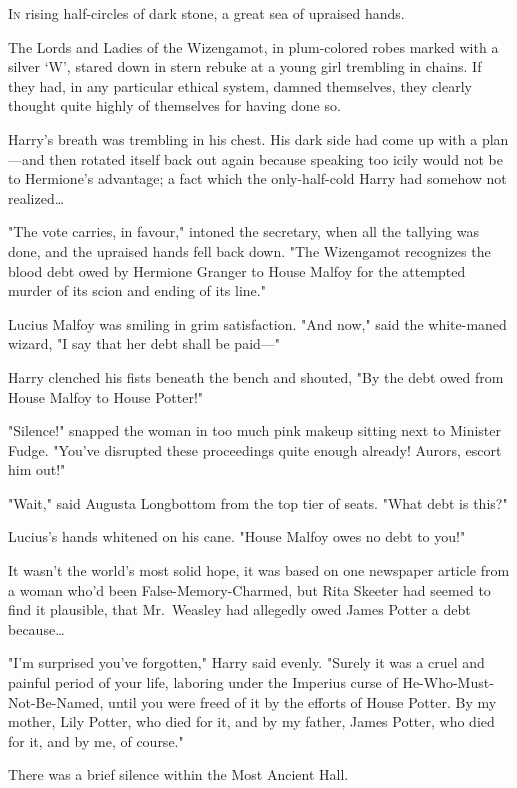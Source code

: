 
\lettrine{I}{n} rising
half-circles of dark stone, a great sea of upraised hands.

\quad\quad
The Lords and Ladies of the Wizengamot, in plum-colored robes marked with a
silver `W', stared down in stern rebuke at a young girl trembling in chains. If
they had, in any particular ethical system, damned themselves, they clearly
thought quite highly of themselves for having done so.

Harry's breath was trembling in his chest. His dark side had come up with a
plan---and then rotated itself back out again because speaking too icily would
not be to Hermione's advantage; a fact which the only-half-cold Harry had
somehow not realized{\ldots}

"The vote carries, in favour," intoned the secretary, when all the tallying was
done, and the upraised hands fell back down. "The Wizengamot recognizes the
blood debt owed by Hermione Granger to House Malfoy for the attempted murder of
its scion and ending of its line."

Lucius Malfoy was smiling in grim satisfaction. "And now," said the white-maned
wizard, "I say that her debt shall be paid---"

Harry clenched his fists beneath the bench and shouted, "By the debt owed from
House Malfoy to House Potter!"

"Silence!" snapped the woman in too much pink makeup sitting next to Minister
Fudge. "You've disrupted these proceedings quite enough already! Aurors, escort
him out!"

"Wait," said Augusta Longbottom from the top tier of seats. "What debt is this?"

Lucius's hands whitened on his cane. "House Malfoy owes no debt to you!"

It wasn't the world's most solid hope, it was based on one newspaper article
from a woman who'd been False-Memory-Charmed, but Rita Skeeter had seemed to
find it plausible, that Mr.~Weasley had allegedly owed James Potter a debt
because{\ldots}

"I'm surprised you've forgotten," Harry said evenly. "Surely it was a cruel and
painful period of your life, laboring under the Imperius curse of
He-Who-Must-Not-Be-Named, until you were freed of it by the efforts of House
Potter. By my mother, Lily Potter, who died for it, and by my father, James
Potter, who died for it, and by me, of course."

There was a brief silence within the Most Ancient Hall.

